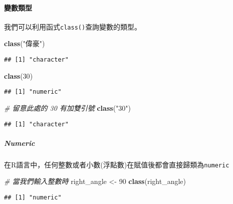 \documentclass[]{article}
\newenvironment{Shaded}{\begin{snugshade}}{\end{snugshade}}
\newcommand{\KeywordTok}[1]{\textcolor[rgb]{0.13,0.29,0.53}{\textbf{{#1}}}}
\newcommand{\DecValTok}[1]{\textcolor[rgb]{0.00,0.00,0.81}{{#1}}}
\newcommand{\StringTok}[1]{\textcolor[rgb]{0.31,0.60,0.02}{{#1}}}
\newcommand{\CommentTok}[1]{\textcolor[rgb]{0.56,0.35,0.01}{\textit{{#1}}}}
\newcommand{\NormalTok}[1]{{#1}}
\let\oldparagraph\paragraph
\renewcommand{\paragraph}[1]{\oldparagraph{#1}\mbox{}}
\let\oldsubparagraph\subparagraph
\renewcommand{\subparagraph}[1]{\oldsubparagraph{#1}\mbox{}}
\begin{document}
\paragraph{變數類型}

我們可以利用函式\texttt{class()}查詢變數的類型。

\begin{Shaded}
\begin{Highlighting}[]
\KeywordTok{class}\NormalTok{(}\StringTok{"偉豪"}\NormalTok{)}
\end{Highlighting}
\end{Shaded}

\begin{verbatim}
## [1] "character"
\end{verbatim}

\begin{Shaded}
\begin{Highlighting}[]
\KeywordTok{class}\NormalTok{(}\DecValTok{30}\NormalTok{)}
\end{Highlighting}
\end{Shaded}

\begin{verbatim}
## [1] "numeric"
\end{verbatim}

\begin{Shaded}
\begin{Highlighting}[]
\CommentTok{# 留意此處的 30 有加雙引號}
\KeywordTok{class}\NormalTok{(}\StringTok{"30"}\NormalTok{)}
\end{Highlighting}
\end{Shaded}

\begin{verbatim}
## [1] "character"
\end{verbatim}

\subparagraph{Numeric}\label{numeric}

在R語言中，任何整數或者小數(浮點數)在賦值後都會直接歸類為\texttt{numeric}

\begin{Shaded}
\begin{Highlighting}[]
\CommentTok{# 當我們輸入整數時}
\NormalTok{right_angle <-}\StringTok{ }\DecValTok{90}
\KeywordTok{class}\NormalTok{(right_angle)}
\end{Highlighting}
\end{Shaded}

\begin{verbatim}
## [1] "numeric"
\end{verbatim}
\end{document}
